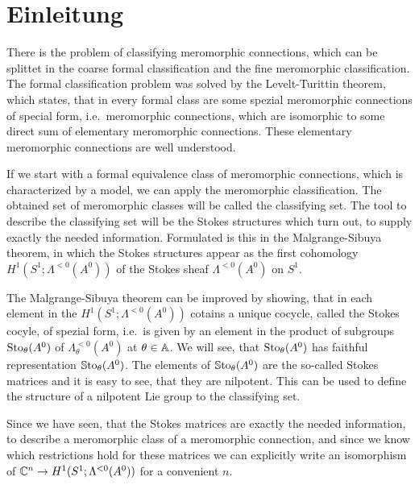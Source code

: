 \chapter{Einleitung}
There is the problem of classifying meromorphic connections, which can be
splittet in the coarse formal classification and the fine meromorphic
classification. The formal classification problem was solved by the
Levelt-Turittin theorem, which states, that in every formal class are some
spezial meromorphic connections of special form, i.e.\ meromorphic connections,
which are isomorphic to some direct sum of elementary meromorphic connections.
These elementary meromorphic connections are well understood.

If we start with a formal equivalence class of meromorphic connections, which
is characterized by a model, we can apply the meromorphic classification.
The obtained set of meromorphic classes will be called the classifying set.
The tool to describe the classifying set will be the Stokes structures which
turn out, to supply exactly the needed information. Formulated is this in the
Malgrange-Sibuya theorem, in which the Stokes structures appear as the first
cohomology $H^1(S^1;\Lambda^{<0}(A^0))$ of the Stokes sheaf $\Lambda^{<0}(A^0)$
on $S^1$.

The Malgrange-Sibuya theorem can be improved by showing, that in each element
in the $H^1(S^1;\Lambda^{<0}(A^0))$ cotains a unique cocycle, called the Stokes
cocyle, of spezial form, i.e.\ is given by an element in the product of
subgroups $\operatorname{Sto}_\theta(A^0)$ of $\Lambda_\theta^{<0}(A^0)$ at
 $\theta\in\mathbb{A}$.
We will see, that $\operatorname{Sto}_\theta(A^0)$ has faithful representation
$\operatorname{\mathbb{S}to}_\theta(A^0)$. The elements of $\operatorname{\mathbb{S}to}_\theta(A^0)$ are the so-called
Stokes matrices and it is easy to see, that they are nilpotent.
This can be used to define the structure of a nilpotent Lie group to the
classifying set.

Since we have seen, that the Stokes matrices are exactly the needed
information, to describe a meromorphic class of a meromorphic connection, and
since we know which restrictions hold for these matrices we can explicitly
write an isomorphism of $\mathbb{C}^n\to H^1(S^1;\Lambda^{<0}(A^0))$ for a convenient
$n$.

\begin{comment}
  \begin{enumerate}
    \item first introduce asymptotic analysis
    \item then define languages for meromorphic connections or systems
    \item talk about Stokes structures
    \item more?
  \end{enumerate}
\end{comment}

